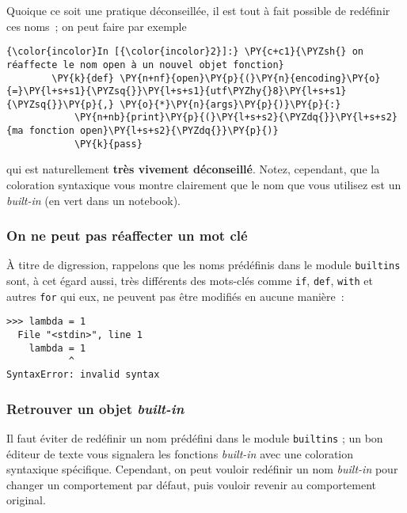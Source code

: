     Quoique ce soit une pratique déconseillée, il est tout à fait possible
de redéfinir ces noms~; on peut faire par exemple

    \begin{Verbatim}[commandchars=\\\{\}]
{\color{incolor}In [{\color{incolor}2}]:} \PY{c+c1}{\PYZsh{} on réaffecte le nom open à un nouvel objet fonction}
        \PY{k}{def} \PY{n+nf}{open}\PY{p}{(}\PY{n}{encoding}\PY{o}{=}\PY{l+s+s1}{\PYZsq{}}\PY{l+s+s1}{utf\PYZhy{}8}\PY{l+s+s1}{\PYZsq{}}\PY{p}{,} \PY{o}{*}\PY{n}{args}\PY{p}{)}\PY{p}{:}
            \PY{n+nb}{print}\PY{p}{(}\PY{l+s+s2}{\PYZdq{}}\PY{l+s+s2}{ma fonction open}\PY{l+s+s2}{\PYZdq{}}\PY{p}{)}
            \PY{k}{pass}
\end{Verbatim}


    qui est naturellement \textbf{très vivement déconseillé}. Notez,
cependant, que la coloration syntaxique vous montre clairement que le
nom que vous utilisez est un \emph{built-in} (en vert dans un notebook).

    \hypertarget{on-ne-peut-pas-ruxe9affecter-un-mot-cluxe9}{%
\subsubsection{On ne peut pas réaffecter un mot
clé}\label{on-ne-peut-pas-ruxe9affecter-un-mot-cluxe9}}

    À titre de digression, rappelons que les noms prédéfinis dans le module
\texttt{builtins} sont, à cet égard aussi, très différents des mots-clés
comme \texttt{if}, \texttt{def}, \texttt{with} et autres \texttt{for}
qui eux, ne peuvent pas être modifiés en aucune manière~:

\begin{verbatim}
>>> lambda = 1
  File "<stdin>", line 1
    lambda = 1
           ^
SyntaxError: invalid syntax
\end{verbatim}

    \hypertarget{retrouver-un-objet-built-in}{%
\subsubsection{\texorpdfstring{Retrouver un objet
\emph{built-in}}{Retrouver un objet built-in}}\label{retrouver-un-objet-built-in}}

    Il faut éviter de redéfinir un nom prédéfini dans le module
\texttt{builtins} ; un bon éditeur de texte vous signalera les fonctions
\emph{built-in} avec une coloration syntaxique spécifique. Cependant, on
peut vouloir redéfinir un nom \emph{built-in} pour changer un
comportement par défaut, puis vouloir revenir au comportement original.\\

